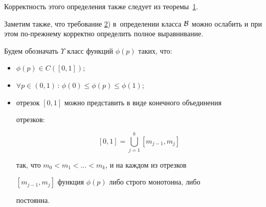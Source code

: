 \smallskip



Корректность этого определения также следует из теоремы~\hyperlink{newth}{1}.

Заметим также, что требование \hyperlink{def.3.2}{2}) в~определении класса ${\cal B}$ можно ослабить и при этом по-прежнему корректно определить полное выравнивание.



\smallskip



\hypertarget{palin:definition9}{}



\begin{definition}[9]Будем обозначать $\Upsilon$ класс функций $\phi(p)$ таких, что:

\begin{itemize}

\item[1)] $\phi(p)\in C([0,1])$;

\item[2)] $\forall p\in(0,1) \,:\, \phi(0)\le\phi(p)\le\phi(1)$;

\item[3)] отрезок $[0,1]$ можно представить в виде конечного объединения

отрезков:

$$

[0,1]=\bigcup\limits_{j=1}^k[m_{j-1},m_j]

$$

так, что $m_0<m_1<\dots<m_k$, и на каждом из отрезков

$[m_{j-1},m_j]$ функция $\phi(p)$ либо строго монотонна, либо

постоянна.



\end{itemize}

\end{definition}





\smallskip





\hypertarget{palin:definition10}{}



